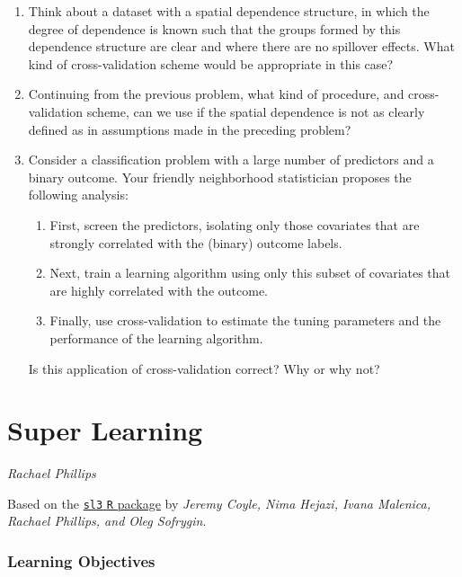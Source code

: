 \documentclass[
  12pt, krantz2,
]{krantz}
\newcommand{\passthrough}[1]{#1}
\providecommand{\tightlist}{%
  \setlength{\itemsep}{0pt}\setlength{\parskip}{0pt}}
\newcommand{\1}{\mathbbm{1}}
\theoremstyle{definition}
\theoremstyle{definition}
\theoremstyle{definition}
\theoremstyle{definition}
\theoremstyle{remark}
\begin{document}
\begin{enumerate}
\def\labelenumi{\arabic{enumi}.}
\item
  Think about a dataset with a spatial dependence structure, in which the
  degree of dependence is known such that the groups formed by this dependence
  structure are clear and where there are no spillover effects. What kind of
  cross-validation scheme would be appropriate in this case?
\item
  Continuing from the previous problem, what kind of procedure, and
  cross-validation scheme, can we use if the spatial dependence is not as
  clearly defined as in assumptions made in the preceding problem?
\item
  Consider a classification problem with a large number of predictors and a
  binary outcome. Your friendly neighborhood statistician proposes the
  following analysis:

  \begin{enumerate}
  \def\labelenumii{\alph{enumii}.}
  \tightlist
  \item
    First, screen the predictors, isolating only those covariates that are
    strongly correlated with the (binary) outcome labels.
  \item
    Next, train a learning algorithm using only this subset of covariates
    that are highly correlated with the outcome.
  \item
    Finally, use cross-validation to estimate the tuning parameters and the
    performance of the learning algorithm.
  \end{enumerate}

  Is this application of cross-validation correct? Why or why not?
\end{enumerate}

\hypertarget{sl3}{%
\chapter{Super Learning}\label{sl3}}

\emph{Rachael Phillips}

Based on the \href{https://github.com/tlverse/sl3}{\passthrough{\lstinline!sl3!} \passthrough{\lstinline!R!} package} by \emph{Jeremy
Coyle, Nima Hejazi, Ivana Malenica, Rachael Phillips, and Oleg Sofrygin}.

\hypertarget{learning-objectives}{%
\subsection*{Learning Objectives}\label{learning-objectives}}
\end{document}

